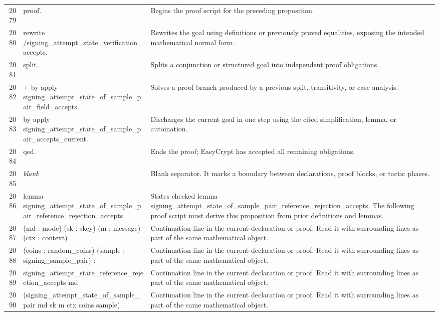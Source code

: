 \documentclass[10pt]{article}
\begin{document}
\begin{longtable}{r L{0.53\textwidth} L{0.37\textwidth}}
2079 & {\ttfamily\scriptsize proof.} & Begins the proof script for the preceding proposition. \\
2080 & {\ttfamily\scriptsize rewrite /signing\_attempt\_state\_verification\_accepts.} & Rewrites the goal using definitions or previously proved equalities, exposing the intended mathematical normal form. \\
2081 & {\ttfamily\scriptsize split.} & Splits a conjunction or structured goal into independent proof obligations. \\
2082 & {\ttfamily\scriptsize + by apply signing\_attempt\_state\_of\_sample\_pair\_field\_accepts.} & Solves a proof branch produced by a previous split, transitivity, or case analysis. \\
2083 & {\ttfamily\scriptsize by apply signing\_attempt\_state\_of\_sample\_pair\_accepts\_current.} & Discharges the current goal in one step using the cited simplification, lemma, or automation. \\
2084 & {\ttfamily\scriptsize qed.} & Ends the proof; EasyCrypt has accepted all remaining obligations. \\
2085 & {\ttfamily\scriptsize \emph{blank}} & Blank separator.  It marks a boundary between declarations, proof blocks, or tactic phases. \\
2086 & {\ttfamily\scriptsize lemma signing\_attempt\_state\_of\_sample\_pair\_reference\_rejection\_accepts} & States checked lemma signing\_attempt\_state\_of\_sample\_pair\_reference\_rejection\_accepts.  The following proof script must derive this proposition from prior definitions and lemmas. \\
2087 & {\ttfamily\scriptsize    (md : mode) (sk : skey) (m : message) (ctx : context)} & Continuation line in the current declaration or proof.  Read it with surrounding lines as part of the same mathematical object. \\
2088 & {\ttfamily\scriptsize    (coins : random\_coins) (sample : signing\_sample\_pair) :} & Continuation line in the current declaration or proof.  Read it with surrounding lines as part of the same mathematical object. \\
2089 & {\ttfamily\scriptsize   signing\_attempt\_state\_reference\_rejection\_accepts md} & Continuation line in the current declaration or proof.  Read it with surrounding lines as part of the same mathematical object. \\
2090 & {\ttfamily\scriptsize     (signing\_attempt\_state\_of\_sample\_pair md sk m ctx coins sample).} & Continuation line in the current declaration or proof.  Read it with surrounding lines as part of the same mathematical object. \\

\end{longtable}
\end{document}
